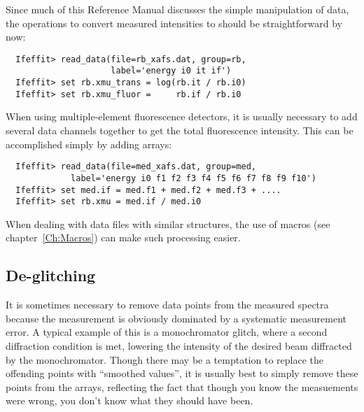 Since much of this Reference Manual discusses the simple manipulation of
data, the operations to convert measured intensities to {\muE} should be
straightforward by now:
\begin{verbatim}
  Ifeffit> read_data(file=rb_xafs.dat, group=rb, 
                     label='energy i0 it if')
  Ifeffit> set rb.xmu_trans = log(rb.it / rb.i0)
  Ifeffit> set rb.xmu_fluor =     rb.if / rb.i0
\end{verbatim}
\noindent 
When using multiple-element fluorescence detectors, it is usually necessary
to add several data channels together to get the total fluorescence
intensity.  This can be accomplished simply by adding arrays:
\begin{verbatim}
  Ifeffit> read_data(file=med_xafs.dat, group=med, 
             label='energy i0 f1 f2 f3 f4 f5 f6 f7 f8 f9 f10')
  Ifeffit> set med.if = med.f1 + med.f2 + med.f3 + ....
  Ifeffit> set rb.xmu = med.if / med.i0
\end{verbatim}
\noindent 
When dealing with data files with similar structures, the use of macros (see
chapter~\ref{Ch:Macros}) can make such processing easier.





\subsection{De-glitching}
\label{Ch:XAFSProcess-deglitching} 

It is sometimes necessary to remove data points from the measured {\muE}
spectra because the measurement is obviously dominated by a systematic
measurement error.  A typical example of this is a monochromator glitch,
where a second diffraction condition is met, lowering the intensity of the
desired beam diffracted by the monochromator.  Though there may be a
temptation to replace the offending points with ``smoothed values'', it is
usually best to simply remove these points from the arrays, reflecting the
fact that though you know the measuements were wrong, you don't know what
they should have been.

